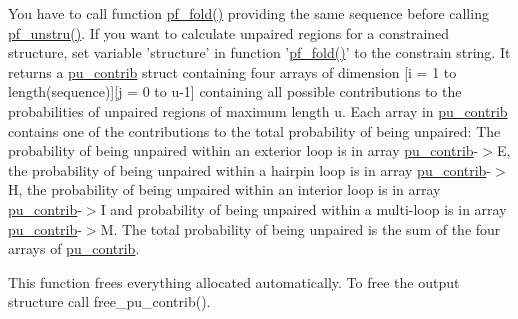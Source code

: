 You have to call function \hyperlink{group__pf__fold_gadc3db3d98742427e7001a7fd36ef28c2}{pf\-\_\-fold()} providing the same sequence before calling \hyperlink{group__up__cofold_ga5b4ee40e190d2f633cd01cf0d2fe93cf}{pf\-\_\-unstru()}. If you want to calculate unpaired regions for a constrained structure, set variable 'structure' in function '\hyperlink{group__pf__fold_gadc3db3d98742427e7001a7fd36ef28c2}{pf\-\_\-fold()}' to the constrain string. It returns a \hyperlink{group__data__structures_structpu__contrib}{pu\-\_\-contrib} struct containing four arrays of dimension \mbox{[}i = 1 to length(sequence)\mbox{]}\mbox{[}j = 0 to u-\/1\mbox{]} containing all possible contributions to the probabilities of unpaired regions of maximum length u. Each array in \hyperlink{group__data__structures_structpu__contrib}{pu\-\_\-contrib} contains one of the contributions to the total probability of being unpaired\-: The probability of being unpaired within an exterior loop is in array \hyperlink{group__data__structures_structpu__contrib}{pu\-\_\-contrib}-\/$>$E, the probability of being unpaired within a hairpin loop is in array \hyperlink{group__data__structures_structpu__contrib}{pu\-\_\-contrib}-\/$>$H, the probability of being unpaired within an interior loop is in array \hyperlink{group__data__structures_structpu__contrib}{pu\-\_\-contrib}-\/$>$I and probability of being unpaired within a multi-\/loop is in array \hyperlink{group__data__structures_structpu__contrib}{pu\-\_\-contrib}-\/$>$M. The total probability of being unpaired is the sum of the four arrays of \hyperlink{group__data__structures_structpu__contrib}{pu\-\_\-contrib}.

This function frees everything allocated automatically. To free the output structure call free\-\_\-pu\-\_\-contrib().


